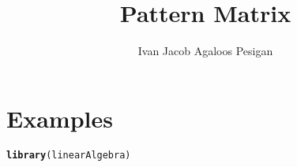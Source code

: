 \documentclass{article}\usepackage[]{graphicx}\usepackage[]{color}
\title{Pattern Matrix}
\author{Ivan Jacob Agaloos Pesigan}
\date{}
\makeatletter
\newcommand{\hlstd}[1]{\textcolor[rgb]{0.345,0.345,0.345}{#1}}%
\newcommand{\hlkwd}[1]{\textcolor[rgb]{0.737,0.353,0.396}{\textbf{#1}}}%
\newenvironment{kframe}{%
 \def\at@end@of@kframe{}%
 \ifinner\ifhmode%
  \def\at@end@of@kframe{\end{minipage}}%
  \begin{minipage}{\columnwidth}%
 \fi\fi%
 \def\FrameCommand##1{\hskip\@totalleftmargin \hskip-\fboxsep
 \colorbox{shadecolor}{##1}\hskip-\fboxsep
     \hskip-\linewidth \hskip-\@totalleftmargin \hskip\columnwidth}%
 \MakeFramed {\advance\hsize-\width
   \@totalleftmargin\z@ \linewidth\hsize
   \@setminipage}}%
 {\par\unskip\endMakeFramed%
 \at@end@of@kframe}
\newenvironment{knitrout}{}{} %
\makeatother
\begin{document}
\maketitle

















\newpage

\section*{Examples}

\begin{knitrout}
\color{fgcolor}\begin{kframe}
\begin{alltt}
\hlkwd{library}\hlstd{(linearAlgebra)}
\end{alltt}
\end{kframe}
\end{knitrout}
\end{document}
